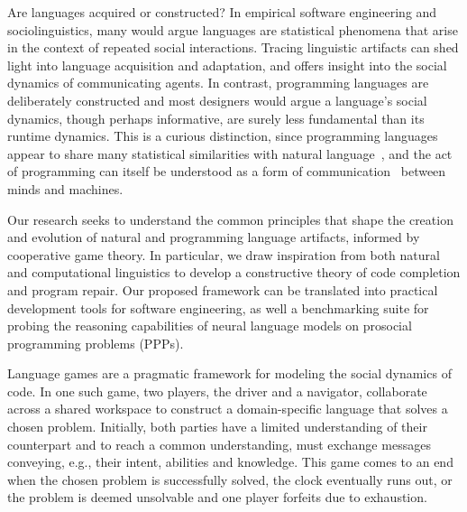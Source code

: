 \documentclass[sigplan,screen]{acmart}
\begin{document}

Are languages acquired or constructed? In empirical software engineering and sociolinguistics, many would argue languages are statistical phenomena that arise in the context of repeated social interactions. Tracing linguistic artifacts can shed light into language acquisition and adaptation, and offers insight into the social dynamics of communicating agents. In contrast, programming languages are deliberately constructed and most designers would argue a language's social dynamics, though perhaps informative, are surely less fundamental than its runtime dynamics. This is a curious distinction, since programming languages appear to share many statistical similarities with natural language~\cite{hindle2016naturalness}, and the act of programming can itself be understood as a form of communication~\cite{demillo1979social} between minds and machines.

Our research seeks to understand the common principles that shape the creation and evolution of natural and programming language artifacts, informed by cooperative game theory. In particular, we draw inspiration from both natural and computational linguistics to develop a constructive theory of code completion and program repair. Our proposed framework can be translated into practical development tools for software engineering, as well a benchmarking suite for probing the reasoning capabilities of neural language models on prosocial programming problems (PPPs).

Language games are a pragmatic framework for modeling the social dynamics of code. In one such game, two players, the driver and a navigator, collaborate across a shared workspace to construct a domain-specific language that solves a chosen problem. Initially, both parties have a limited understanding of their counterpart and to reach a common understanding, must exchange messages conveying, e.g., their intent, abilities and knowledge. This game comes to an end when the chosen problem is successfully solved, the clock eventually runs out, or the problem is deemed unsolvable and one player forfeits due to exhaustion.
\end{document}
